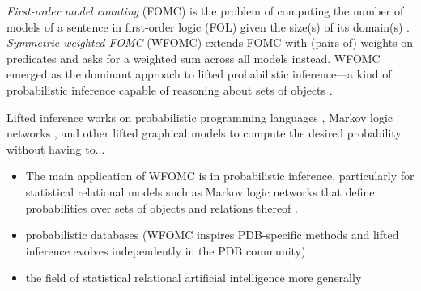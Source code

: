 
\emph{First-order model counting} (FOMC) is the problem of computing the number
of models of a sentence in first-order logic (FOL) given the size(s) of its
domain(s) \citep{DBLP:conf/ijcai/BroeckTMDR11}. \emph{Symmetric weighted FOMC}
(WFOMC) extends FOMC with (pairs of) weights on predicates and asks for a
weighted sum across all models instead. WFOMC emerged as the dominant approach
to lifted probabilistic inference---a kind of probabilistic inference capable of
reasoning about sets of objects \citep{DBLP:conf/ecai/Kersting12}.

Lifted inference works on probabilistic programming languages
\citep{DBLP:journals/ml/RaedtK15,DBLP:journals/ijar/RiguzziBZCL17}, Markov logic
networks \citep{DBLP:journals/ml/RichardsonD06}, and other lifted graphical
models \citep{DBLP:journals/ml/KimmigMG15} to compute the desired probability
without having to...

\begin{itemize}
  \item The main application of WFOMC is in probabilistic inference,
        particularly for statistical relational models such as Markov logic
        networks that define probabilities over sets of objects and relations
        thereof
        \citep{DBLP:conf/ijcai/BroeckTMDR11,DBLP:journals/cacm/GogateD16}.
  \item probabilistic databases (WFOMC inspires PDB-specific methods and lifted
        inference evolves independently in the PDB community)
        \citep{DBLP:journals/pvldb/GatterbauerS15,DBLP:journals/debu/GribkoffSB14}
  \item the field of statistical relational artificial intelligence more
        generally \citep{DBLP:series/synthesis/2016Raedt}
\end{itemize}


